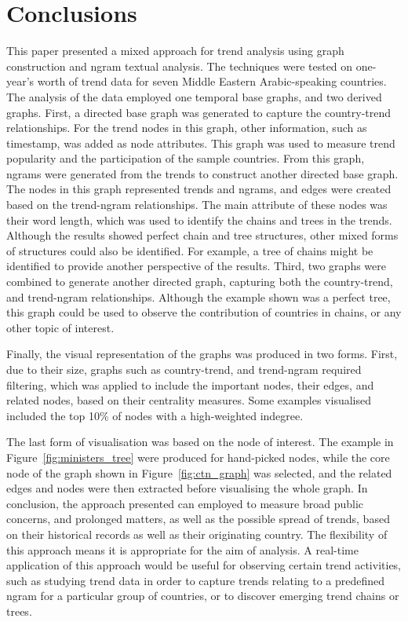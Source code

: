 \documentclass{comjnl}
\begin{document}
{\section{Conclusions}\label{conclusions}

This paper presented a mixed approach for trend analysis using graph construction and ngram textual analysis. The techniques were tested on one-year’s worth of trend data for seven Middle Eastern Arabic-speaking countries. The analysis of the data employed one temporal base graphs, and two derived graphs.  First, a directed base graph was generated to capture the country-trend relationships. For the trend nodes in this graph, other information, such as timestamp, was added as node attributes. This graph was used to measure trend popularity and the participation of the sample countries. From this graph, ngrams were generated from the trends to construct another directed base graph. The nodes in this graph represented trends and ngrams, and edges were created based on the trend-ngram relationships. The main attribute of these nodes was their word length, which was used to identify the chains and trees in the trends. Although the results showed perfect chain and tree structures, other mixed forms of structures could also be identified. For example, a tree of chains might be identified to provide another perspective of the results. Third, two graphs were combined to generate another directed graph, capturing both the country-trend, and trend-ngram relationships. Although the example shown was a perfect tree, this graph could be used to observe the contribution of countries in chains, or any other topic of interest. 

Finally, the visual representation of the graphs was produced in two forms. First, due to their size, graphs such as country-trend, and trend-ngram required filtering, which was applied to include the important nodes, their edges, and related nodes, based on their centrality measures. Some examples visualised included the top 10\% of nodes with a high-weighted indegree. 

The last form of visualisation was based on the node of interest. The example in Figure~\ref{fig:ministers_tree} were produced for hand-picked nodes, while the core node of the graph shown in Figure~\ref{fig:ctn_graph} was selected, and the related edges and nodes were then extracted before visualising the whole graph.  In conclusion, the approach presented can employed to measure broad public concerns, and prolonged matters, as well as the possible spread of trends, based on their historical records as well as their originating country. The flexibility of this approach means it is appropriate for the aim of analysis.  A real-time application of this approach would be useful for observing certain trend activities, such as studying trend data in order to capture trends relating to a predefined ngram for a particular group of countries, or to discover emerging trend chains or trees.

}
\end{document}
